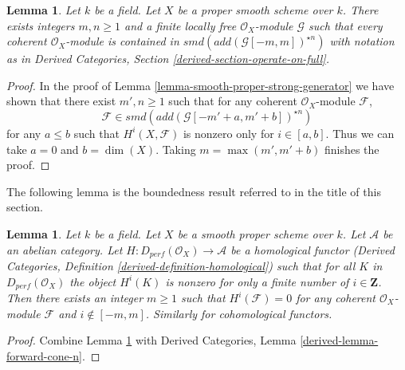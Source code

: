 \documentclass{stacks-project}
\theoremstyle{plain}
\newtheorem{lemma}[subsection]{Lemma}
\theoremstyle{definition}
\theoremstyle{remark}
\numberwithin{equation}{subsection}
\begin{document}
\begin{lemma}
\label{lemma-diagonal-trick-proper}
Let $k$ be a field. Let $X$ be a proper smooth scheme over $k$.
There exists integers $m, n \geq 1$ and a finite locally free
$\mathcal{O}_X$-module $\mathcal{G}$ such that every coherent
$\mathcal{O}_X$-module is contained in $smd(add(\mathcal{G}[-m, m])^{\star n})$
with notation as in Derived Categories, Section
\ref{derived-section-operate-on-full}.
\end{lemma}

\begin{proof}
In the proof of Lemma \ref{lemma-smooth-proper-strong-generator}
we have shown that there exist $m', n \geq 1$ such that for any
coherent $\mathcal{O}_X$-module $\mathcal{F}$,
$$
\mathcal{F} \in smd(add(\mathcal{G}[-m' + a, m' + b])^{\star n})
$$
for any $a \leq b$ such that $H^i(X, \mathcal{F})$ is nonzero only
for $i \in [a, b]$. Thus we can take $a = 0$ and $b = \dim(X)$.
Taking $m = \max(m', m' + b)$ finishes the proof.
\end{proof}

\noindent
The following lemma is the boundedness result referred to
in the title of this section.

\begin{lemma}
\label{lemma-boundedness}
Let $k$ be a field. Let $X$ be a smooth proper scheme over $k$.
Let $\mathcal{A}$ be an abelian category. Let
$H : D_{perf}(\mathcal{O}_X) \to \mathcal{A}$ be a homological
functor (Derived Categories, Definition \ref{derived-definition-homological})
such that for all $K$ in $D_{perf}(\mathcal{O}_X)$ the object
$H^i(K)$ is nonzero for only a finite number of $i \in \mathbf{Z}$.
Then there exists an integer $m \geq 1$ such that
$H^i(\mathcal{F}) = 0$ for any coherent $\mathcal{O}_X$-module
$\mathcal{F}$ and $i \not \in [-m, m]$.
Similarly for cohomological functors.
\end{lemma}

\begin{proof}
Combine Lemma \ref{lemma-diagonal-trick-proper} with
Derived Categories, Lemma \ref{derived-lemma-forward-cone-n}.
\end{proof}
\end{document}
